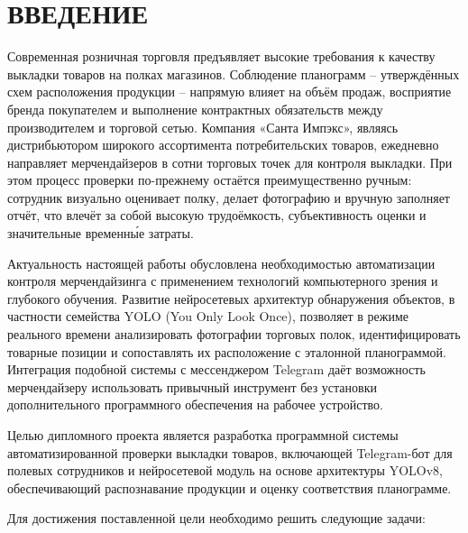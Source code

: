 \sectionbreak \section*{
  \gostTitleFont
  \redline
  ВВЕДЕНИЕ
}

\titlespace

\redline\gostFont
Современная розничная торговля предъявляет высокие требования к качеству
выкладки товаров на полках магазинов.
Соблюдение планограмм {--} утверждённых схем расположения продукции {--} напрямую
влияет на объём продаж, восприятие бренда покупателем и выполнение контрактных
обязательств между производителем и торговой сетью.
Компания «Санта Импэкс», являясь дистрибьютором широкого ассортимента
потребительских товаров, ежедневно направляет мерчендайзеров в сотни торговых
точек для контроля выкладки.
При этом процесс проверки по-прежнему остаётся преимущественно ручным:
сотрудник визуально оценивает полку, делает фотографию и вручную заполняет
отчёт, что влечёт за собой высокую трудоёмкость, субъективность оценки и
значительные временны́е затраты.

\redline\gostFont
Актуальность настоящей работы обусловлена необходимостью автоматизации
контроля мерчендайзинга с применением технологий компьютерного зрения
и глубокого обучения.
Развитие нейросетевых архитектур обнаружения объектов, в частности семейства
YOLO (You Only Look Once), позволяет в режиме реального времени анализировать
фотографии торговых полок, идентифицировать товарные позиции и сопоставлять
их расположение с эталонной планограммой.
Интеграция подобной системы с мессенджером Telegram даёт возможность
мерчендайзеру использовать привычный инструмент без установки дополнительного
программного обеспечения на рабочее устройство.

\redline\gostFont
Целью дипломного проекта является разработка программной системы
автоматизированной проверки выкладки товаров, включающей Telegram-бот
для полевых сотрудников и нейросетевой модуль на основе архитектуры YOLOv8,
обеспечивающий распознавание продукции и оценку соответствия планограмме.

\redline\gostFont
Для достижения поставленной цели необходимо решить следующие задачи:

